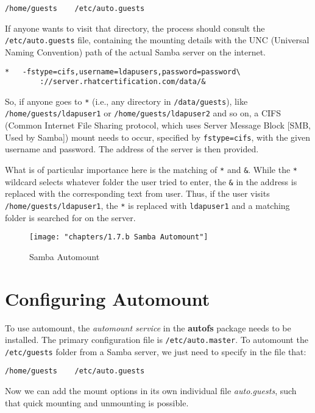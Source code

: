 \begin{verbatim}
/home/guests	/etc/auto.guests
\end{verbatim}

\noindent
If anyone wants to visit that directory, the process should consult the \verb|/etc/auto.guests| file, containing the mounting details with the UNC (Universal Naming Convention) path of the actual Samba server on the internet. 

\begin{verbatim}
*	-fstype=cifs,username=ldapusers,password=password\ 
		://server.rhatcertification.com/data/&
\end{verbatim}

\noindent
So, if anyone goes to \verb|*| (i.e., any directory in \verb|/data/guests|), like \verb|/home/guests/ldapuser1| or \verb|/home/guests/ldapuser2| and so on, a CIFS (Common Internet File Sharing protocol, which uses Server Message Block [SMB, Used by Samba]) mount needs to occur, specified by \verb|fstype=cifs|, with the given username and password. The address of the server is then provided. 

What is of particular importance here is the matching of \verb|*| and \verb|&|. While the \verb|*| wildcard selects whatever folder the user tried to enter, the \verb|&| in the address is replaced with the corresponding text from user. Thus, if the user visits \verb|/home/guests/ldapuser1|, the \verb|*| is replaced with \verb|ldapuser1| and a matching folder is searched for on the server. 

\begin{figure}[H]
	\centering
	\texttt{[image: "chapters/1.7.b Samba Automount"]}
	\caption{Samba Automount}
	\label{fig:1}
\end{figure}


\section{Configuring Automount}
To use automount, the \textit{automount service} in the \textbf{autofs} package needs to be installed. The primary configuration file is \verb|/etc/auto.master|. To automount the \verb|/etc/guests| folder from a Samba server, we just need to specify in the file that:

\begin{verbatim}
/home/guests	/etc/auto.guests
\end{verbatim}

Now we can add the mount options in its own individual file \textit{auto.guests}, such that quick mounting and unmounting is possible. 

